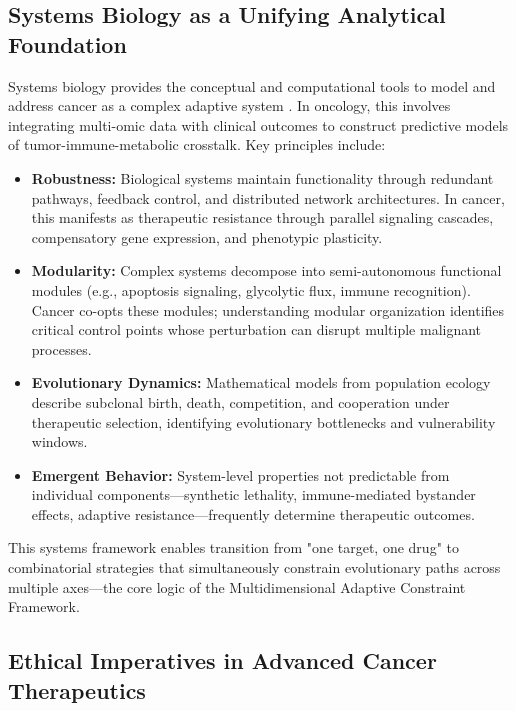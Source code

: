 \documentclass[12pt,a4paper]{article}
\begin{document}
\subsection{Systems Biology as a Unifying Analytical Foundation}

Systems biology provides the conceptual and computational tools to model and address cancer as a complex adaptive system \citep{kitano2002}. In oncology, this involves integrating multi-omic data with clinical outcomes to construct predictive models of tumor-immune-metabolic crosstalk. Key principles include:

\begin{itemize}[leftmargin=*]
    \item \textbf{Robustness:} Biological systems maintain functionality through redundant pathways, feedback control, and distributed network architectures. In cancer, this manifests as therapeutic resistance through parallel signaling cascades, compensatory gene expression, and phenotypic plasticity.
    
    \item \textbf{Modularity:} Complex systems decompose into semi-autonomous functional modules (e.g., apoptosis signaling, glycolytic flux, immune recognition). Cancer co-opts these modules; understanding modular organization identifies critical control points whose perturbation can disrupt multiple malignant processes.
    
    \item \textbf{Evolutionary Dynamics:} Mathematical models from population ecology describe subclonal birth, death, competition, and cooperation under therapeutic selection, identifying evolutionary bottlenecks and vulnerability windows.
    
    \item \textbf{Emergent Behavior:} System-level properties not predictable from individual components—synthetic lethality, immune-mediated bystander effects, adaptive resistance—frequently determine therapeutic outcomes.
\end{itemize}

This systems framework enables transition from "one target, one drug" to combinatorial strategies that simultaneously constrain evolutionary paths across multiple axes—the core logic of the Multidimensional Adaptive Constraint Framework.

\subsection{Ethical Imperatives in Advanced Cancer Therapeutics}
\end{document}
